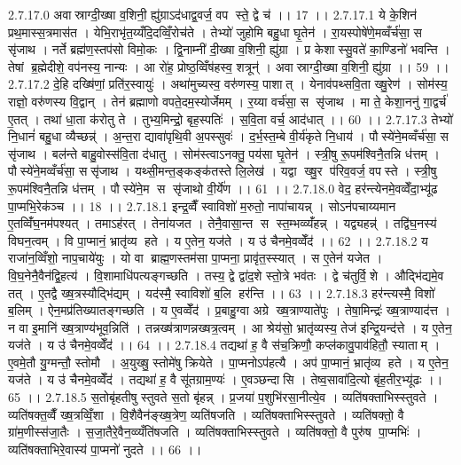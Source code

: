 2.7.17.0
अवास्राग्दी॒ख्षा व॒शिनी॒ ह्यु॑ग्राऽद॑धाद्व॒वर्ज॒ वप॑ स्ते॒ द्वे च॑ ।। 17 ।।
2.7.17.1
ये के॒शिन॑ प्रथ॒मास्स॒त्रमास॑त । येभि॒राभृ॑त॒य्यँदि॒दव्विँ॒रोच॑ते । तेभ्यो॑ जुहोमि बहु॒धा घृ॒तेन॑ । रा॒यस्पोषे॑णे॒मव्वँर्च॑सा॒ स सृ॑जाथ । नर्ते ब्रह्म॑ण॒स्तप॑सो विमो॒कः । द्वि॒नाम्नी॑ दी॒ख्षा व॒शिनी॒ ह्यु॑ग्रा । प्र केशास्सु॒वते॑ का॒ण्डिनो॑ भवन्ति । तेषां ब्र॒ह्मेदीशे॒ वप॑नस्य॒ नान्यः । आ रो॑ह॒ प्रोष्ठ॒व्विँष॑हस्व॒ शत्रून्॑ । अवास्राग्दी॒ख्षा व॒शिनी॒ ह्यु॑ग्रा ।। 59 ।।
2.7.17.2
दे॒हि दख्षि॑णां॒ प्रति॑र॒स्वायुः॑ । अथा॑मुच्यस्व॒ वरु॑णस्य॒ पाशात् । येनाव॑पथ्सवि॒ता ख्षु॒रेण॑ । सोम॑स्य॒ राज्ञो॒ वरु॑णस्य वि॒द्वान् । तेन॑ ब्रह्माणो वपते॒दम॒स्योर्जेमम् । र॒य्या वर्च॑सा॒ स सृ॑जाथ । मा ते॒ केशा॒ननु॑ गा॒द्वर्च॑ ए॒तत् । तथा॑ धा॒ता क॑रोतु ते । तुभ्य॒मिन्द्रो॒ बृह॒स्पतिः॑ । स॒वि॒ता वर्च॒ आद॑धात् ।। 60 ।।
2.7.17.3
तेभ्यो॑ नि॒धानं॑ बहु॒धा व्यैच्छन्न्॑ । अ॒न्त॒रा द्यावा॑पृथि॒वी अ॒पस्सुवः॑ । द॒र्भ॒स्त॒म्बे वी॒र्य॑कृते नि॒धाय॑ । पौस्ये॑ने॒मव्वँर्च॑सा॒ स सृ॑जाथ । बल॑न्ते बाहु॒वोस्स॑वि॒ता द॑धातु । सोम॑स्त्वाऽनक्तु॒ पय॑सा घृ॒तेन॑ । स्त्री॒षु रू॒पम॑श्विनै॒तन्नि ध॑त्तम् । पौस्ये॑ने॒मव्वँर्च॑सा॒ ससृ॑जाथ । यथ्सी॒मन्त॒ङ्कङ्क॑तस्ते लि॒लेख॑ । यद्वा ख्षु॒र प॑रिव॒वर्ज॒ वप॑स्ते । स्त्री॒षु रू॒पम॑श्विनै॒तन्नि ध॑त्तम् । पौस्ये॑ने॒म स सृ॑जाथो वी॒र्ये॑ण ।। 61 ।।
2.7.18.0
वेद॒ हर॑न्त्येनमे॒वव्वेँदा॒भ्यू॑ढ पा॒प्मभि॒रेक॑ञ्च ।। 18 ।।
2.7.18.1
इन्द्र॒व्वैँ स्वाविशो॑ म॒रुतो॒ नापा॑चायन्न् । सोऽन॑पचाय्यमान ए॒तव्विँ॑घ॒नम॑पश्यत् । तमाऽह॑रत् । तेना॑यजत । तेनै॒वासा॒न्त स॑ स्त॒म्भव्व्यँ॑हन्न् । यद्व्यहन्न्॑ । तद्वि॑घ॒नस्य॑ विघन॒त्वम् । वि पा॒प्मानं॒ भ्रातृ॑व्य हते । य ए॒तेन॒ यज॑ते । य उ॑ चैनमे॒वव्वेँद॑ ।। 62 ।।
2.7.18.2
य राजा॑न॒व्विँशो॒ नाप॒चाये॑युः । यो वा ब्राह्म॒णस्तम॑सा पा॒प्मना॒ प्रावृ॑त॒स्स्यात् । स ए॒तेन॑ यजेत । वि॒घ॒नेनै॒वैन॑द्वि॒हत्य॑ । वि॒शामाधि॑पत्यङ्गच्छति । तस्य॒ द्वे द्वा॑द॒शे स्तो॒त्रे भव॑तः । द्वे च॑तुर्वि॒॒शे । औद्भि॑द्यमे॒व तत् । ए॒तद्वै ख्ष॒त्रस्यौद्भि॑द्यम् । यद॑स्मै॒ स्वाविशो॑ ब॒लि हर॑न्ति ।। 63 ।।
2.7.18.3
हर॑न्त्यस्मै॒ विशो॑ ब॒लिम् । ऐन॒मप्र॑तिख्यातङ्गच्छति । य ए॒वव्वेँद॑ । प्र॒बाहु॒ग्वा अग्रे ख्ष॒त्राण्याते॑पुः । तेषा॒मिन्द्रः॑ ख्ष॒त्राण्याद॑त्त । न वा इ॒मानि॑ ख्ष॒त्राण्य॑भूव॒न्निति॑ । तन्नख्ष॑त्राणन्नख्षत्र॒त्वम् । आ श्रेय॑सो॒ भ्रातृ॑व्यस्य॒ तेज॑ इन्द्रि॒यन्द॑त्ते । य ए॒तेन॒ यज॑ते । य उ॑ चैनमे॒वव्वेँद॑ ।। 64 ।।
2.7.18.4
तद्यथा॑ ह॒ वै स॑च॒क्रिणौ॒ कप्ल॑कावु॒पाव॑हितौ॒ स्याताम् । ए॒वमे॒तौ यु॒ग्मन्तौ॒ स्तोमौ । अ॒युख्षु॒ स्तोमे॑षु क्रियेते । पा॒प्मनोऽप॑हत्यै । अप॑ पा॒प्मानं॒ भ्रातृ॑व्य हते । य ए॒तेन॒ यज॑ते । य उ॑ चैनमे॒वव्वेँद॑ । तद्यथा॑ ह॒ वै सू॑तग्राम॒ण्यः॑ । ए॒वञ्छन्दा॑सि । तेष्व॒सावा॑दि॒त्यो बृ॑ह॒तीर॒भ्यू॑ढः ।। 65 ।।
2.7.18.5
स॒तोबृ॑हतीषु स्तुवते स॒तो बृ॑हन्न् । प्र॒जया॑ प॒शुभि॑रसा॒नीत्ये॒व । व्यति॑षक्ताभिस्स्तुवते । व्यति॑षक्त॒व्वैँ ख्ष॒त्रव्विँ॒शा । वि॒शैवैन॑ङ्ख्ष॒त्रेण॒ व्यति॑षजति । व्यति॑षक्ताभिस्स्तुवते । व्यति॑षक्तो॒ वै ग्रा॑म॒णीस्स॑जा॒तैः । स॒जा॒तैरे॒वैन॒व्व्यँति॑षजति । व्यति॑षक्ताभिस्स्तुवते । व्यति॑षक्तो॒ वै पुरु॑ष पा॒प्मभिः॑ । व्यति॑षक्ताभिरे॒वास्य॑ पा॒प्मनो॑ नुदते ।। 66 ।।
